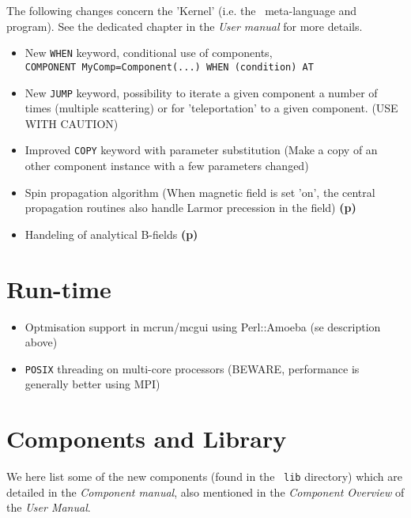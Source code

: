 The following changes concern the 'Kernel' (i.e. the \MCS\ meta-language and program). See the dedicated chapter in the {\it User manual} for more details.

\begin{itemize}
\item New \verb+WHEN+ keyword, conditional use of components,
  \\\verb+COMPONENT MyComp=Component(...) WHEN (condition) AT+
\item New \verb+JUMP+ keyword, possibility to iterate a given component a
  number of times (multiple scattering) or for 'teleportation' to a
  given component. (USE WITH CAUTION)
\item Improved \verb+COPY+ keyword with parameter substitution (Make a copy
  of an other component instance with a few parameters changed)
\item Spin propagation algorithm (When magnetic field is set 'on', the
  central propagation routines also handle Larmor precession in the field) {\bf(p)}
\item Handeling of analytical B-fields {\bf(p)}
\end{itemize}

\section{Run-time}
\label{s:new-features:run-time}

\begin{itemize}
\item Optmisation support in mcrun/mcgui using Perl::Amoeba (se description above)
\item \verb+POSIX+ threading on multi-core processors (BEWARE, performance is generally better using MPI)
\end{itemize}


\section{Components and Library}
\label{s:new-features:components}
 

We here list some of the new components (found in the \MCS\ \verb+lib+ directory)
which are detailed in the {\it Component manual}, also mentioned in
the {\it Component Overview} of the {\it User Manual}.
